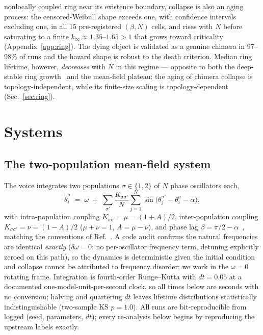 \documentclass[pdflatex,sn-mathphys,Numbered]{sn-jnl}
\begin{document}
\begin{enumerate}
nonlocally coupled ring near its existence boundary, collapse is also an aging
process: the censored-Weibull shape exceeds one, with confidence intervals
excluding one, in all 15 pre-registered $(\beta, N)$ cells, and rises with $N$
before saturating to a finite $k_\infty \approx 1.35$--$1.65 > 1$ that grows toward
criticality (Appendix~\ref{app:ring}). The dying object is validated as a genuine
chimera in $97$--$98\%$ of runs and the hazard shape is robust to the death
criterion. Median ring lifetime, however, \emph{decreases} with $N$ in this regime
--- opposite to both the deep-stable ring growth~\cite{wo2011} and the mean-field
plateau: the aging of chimera collapse is topology-independent, while its
finite-size scaling is topology-dependent (Sec.~\ref{sec:ring}).
\end{enumerate}

\section{Systems}\label{sec:system}

\subsection{The two-population mean-field system}\label{sec:system:meanfield}

The voice integrates two populations $\sigma \in \{1, 2\}$ of $N$ phase oscillators
each,
\begin{equation}
\dot\theta_i^\sigma \;=\; \omega \;+\; \sum_{\sigma'} \frac{K_{\sigma\sigma'}}{N}
\sum_{j=1}^{N} \sin\!\big(\theta_j^{\sigma'} - \theta_i^{\sigma} - \alpha\big),
\label{eq:model}
\end{equation}
with intra-population coupling $K_{\sigma\sigma} = \mu = (1+A)/2$, inter-population
coupling $K_{\sigma\sigma'} = \nu = (1-A)/2$ ($\mu + \nu = 1$, $A = \mu - \nu$), and
phase lag $\beta = \pi/2 - \alpha$~\cite{kuramoto1984,sk1986}, matching the
conventions of Ref.~\cite{abrams2008}. A code audit confirms the natural frequencies are identical
\emph{exactly} ($\delta\omega = 0$: no per-oscillator frequency term, detuning
explicitly zeroed on this path), so the dynamics is deterministic given the initial
condition and collapse cannot be attributed to frequency disorder; we work in the
$\omega = 0$ rotating frame. Integration is fourth-order Runge--Kutta with
$dt = 0.05$ at a documented one-model-unit-per-second clock, so all times below are
seconds with no conversion; halving and quartering $dt$ leaves lifetime
distributions statistically indistinguishable (two-sample KS $p = 1.0$). All runs are
bit-reproducible from logged (seed, parameters, $dt$); every re-analysis below begins
by reproducing the upstream labels exactly.
\end{document}
